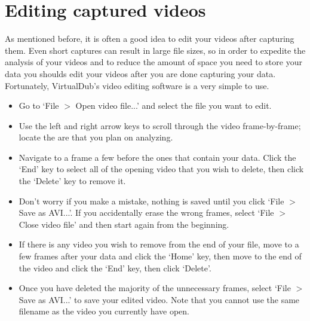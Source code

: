 \section*{Editing captured videos}
As mentioned before, it is often a good idea to edit your videos after capturing them.
Even short captures can result in large file sizes, so in order to expedite the analysis of your videos and to reduce the amount of space you need to store your data you shoulds edit your videos after you are done capturing your data.
Fortunately, VirtualDub's video editing software is a very simple to use.
\begin{itemize}
\itemsep-0.3em
\item Go to `File $>$ Open video file...' and select the file you want to edit.
\item Use the left and right arrow keys to scroll through the video frame-by-frame; locate the are that you plan on analyzing.
\item Navigate to a frame a few before the ones that contain your data. Click the `End' key to select all of the opening video that you wish to delete, then click the `Delete' key to remove it.
\item Don't worry if you make a mistake, nothing is saved until you click `File $>$ Save as AVI...'. If you accidentally erase the wrong frames, select `File $>$ Close video file' and then start again from the beginning.
\item If there is any video you wish to remove from the end of your file, move to a few frames after your data and click the `Home' key, then move to the end of the video and click the `End' key, then click `Delete'.
\item Once you have deleted the majority of the unnecessary frames, select `File $>$ Save as AVI...' to save your edited video. Note that you cannot use the same filename as the video you currently have open.
\end{itemize}

